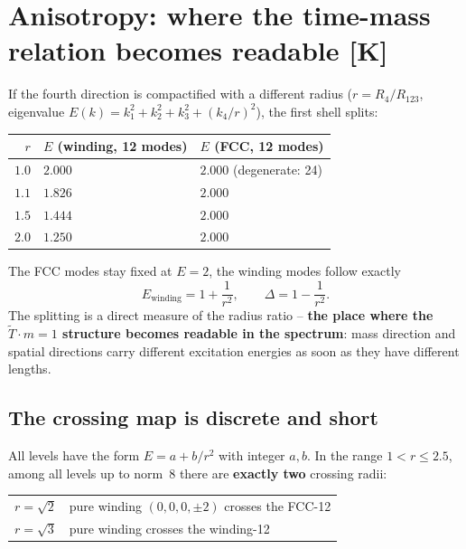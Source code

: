 \documentclass[11pt]{report}
\begin{document}
\chapter{Anisotropy: where the time-mass relation becomes readable [K]}

If the fourth direction is compactified with a different radius
($r = R_4/R_{123}$, eigenvalue
$E(k) = k_1^2+k_2^2+k_3^2+(k_4/r)^2$), the first shell splits:

\begin{center}
\begin{tabular}{rll}
\toprule
$r$ & $E$ (winding, 12 modes) & $E$ (FCC, 12 modes) \\
\midrule
$1.0$ & $2.000$ & $2.000$ (degenerate: 24) \\
$1.1$ & $1.826$ & $2.000$ \\
$1.5$ & $1.444$ & $2.000$ \\
$2.0$ & $1.250$ & $2.000$ \\
\bottomrule
\end{tabular}
\end{center}

The FCC modes stay fixed at $E = 2$, the winding modes follow
exactly
\begin{equation}
  E_\text{winding} = 1 + \frac{1}{r^2},
  \qquad
  \Delta = 1 - \frac{1}{r^2}.
\end{equation}
The splitting is a direct measure of the radius ratio -- \textbf{the
place where the $\tilde T\cdot m = 1$ structure becomes readable in
the spectrum}: mass direction and spatial directions carry different
excitation energies as soon as they have different lengths.

\section{The crossing map is discrete and short}

All levels have the form $E = a + b/r^2$ with integer $a, b$. In the
range $1 < r \le 2.5$, among all levels up to norm~8 there are
\textbf{exactly two} crossing radii:

\begin{center}
\begin{tabular}{ll}
\toprule
$r = \sqrt{2}$ & pure winding $(0,0,0,\pm2)$ crosses the FCC-12 \\
$r = \sqrt{3}$ & pure winding crosses the winding-12 \\
\bottomrule
\end{tabular}
\end{center}
\end{document}
